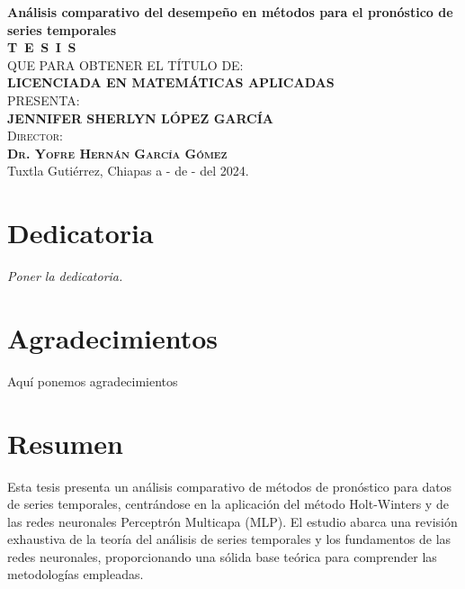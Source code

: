 \documentclass[
  us-letterpaper,
]{scrreprt}
\renewcommand*\contentsname{Tabla de contenidos}
\newcommand\contentsname{Tabla de contenidos}
\theoremstyle{plain}
\theoremstyle{definition}
\theoremstyle{plain}
\theoremstyle{definition}
\theoremstyle{remark}
\begin{document}
\begin{titlepage}
\begin{minipage}[t][0.95\textheight][c]{0.76\textwidth}
            \begin{center}
                {\Large\bfseries Análisis comparativo del desempeño en métodos para el pronóstico de series temporales}\\[2cm]
                \textsc{\huge \textbf{T\, E\, S\, I\, S}}\\[1.5cm]
                \textsc{\large QUE PARA OBTENER EL TÍTULO DE:}\\[0.3cm]
                \textbf{\textsc{LICENCIADA EN MATEMÁTICAS APLICADAS}}\\[1.5cm]
                \textsc{\large PRESENTA:}\\[0.3cm]
                \textbf{\textsc{\large {JENNIFER SHERLYN LÓPEZ GARCÍA}}}\\[2cm]
                {\large\scshape Director:\\[0.3cm]
                {\textbf{\large Dr. Yofre Hernán García Gómez }}}\\[2.0cm]
                \large{Tuxtla Gutiérrez, Chiapas a - de - del 2024.}

            \end{center}
\end{minipage}
\end{titlepage}

\pagebreak[2]

\chapter*{Dedicatoria}
\begin{flushright}
\textit{Poner la dedicatoria.}
\end{flushright}


\chapter*{Agradecimientos}
Aquí ponemos agradecimientos
\renewcommand*\contentsname{Tabla de contenidos}
{
\hypersetup{linkcolor=}
\setcounter{tocdepth}{2}
\tableofcontents
}

\chapter*{Resumen}\label{resumen}


Esta tesis presenta un análisis comparativo de métodos de pronóstico
para datos de series temporales, centrándose en la aplicación del método
Holt-Winters y de las redes neuronales Perceptrón Multicapa (MLP). El
estudio abarca una revisión exhaustiva de la teoría del análisis de
series temporales y los fundamentos de las redes neuronales,
proporcionando una sólida base teórica para comprender las metodologías
empleadas.
\end{document}
